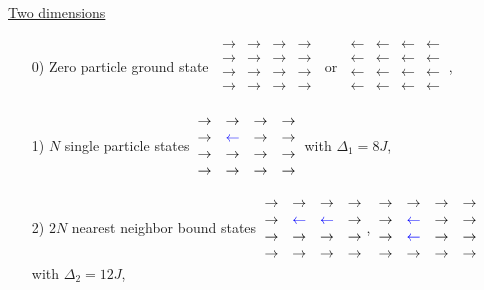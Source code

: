 \noindent \underline{Two dimensions}
\begin{enumerate}
	\item[0)] Zero particle ground state $\: \begin{matrix} \rightarrow & \rightarrow & \rightarrow & \rightarrow \\  \rightarrow & \rightarrow & \rightarrow & \rightarrow \\ \rightarrow & \rightarrow & \rightarrow & \rightarrow \\ \rightarrow & \rightarrow & \rightarrow & \rightarrow \\ \end{matrix} \:$ or $\: \begin{matrix} \leftarrow & \leftarrow & \leftarrow & \leftarrow \\  \leftarrow & \leftarrow & \leftarrow & \leftarrow \\ \leftarrow & \leftarrow & \leftarrow & \leftarrow \\ \leftarrow & \leftarrow & \leftarrow & \leftarrow \\ \end{matrix} \:$,
	\item[1)] $N$ single particle states $\: \begin{matrix} \rightarrow & \rightarrow & \rightarrow & \rightarrow \\  \rightarrow & \textcolor{blue}{\leftarrow} & \rightarrow & \rightarrow \\ \rightarrow & \rightarrow & \rightarrow & \rightarrow \\ \rightarrow & \rightarrow & \rightarrow & \rightarrow \\ \end{matrix} \:$ with $\Delta_1 = 8J$,
	\item[2)] $2N$ nearest neighbor bound states $\: \begin{matrix} \rightarrow & \rightarrow & \rightarrow & \rightarrow \\  \rightarrow & \textcolor{blue}{\leftarrow} & \textcolor{blue}{\leftarrow} & \rightarrow \\ \rightarrow & \rightarrow & \rightarrow & \rightarrow \\ \rightarrow & \rightarrow & \rightarrow & \rightarrow \\ \end{matrix} \:$, $\: \begin{matrix} \rightarrow & \rightarrow & \rightarrow & \rightarrow \\  \rightarrow & \textcolor{blue}{\leftarrow} & \rightarrow & \rightarrow \\ \rightarrow & \textcolor{blue}{\leftarrow} & \rightarrow & \rightarrow \\ \rightarrow & \rightarrow & \rightarrow & \rightarrow \\ \end{matrix} \:$ with $\Delta_2 = 12J$,

\end{enumerate}
